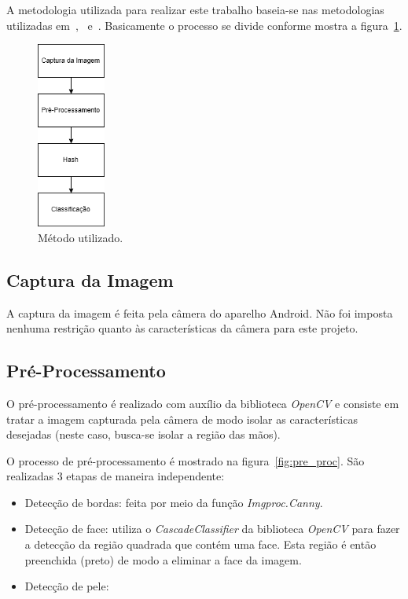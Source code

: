 \par A metodologia utilizada para realizar este trabalho baseia-se nas metodologias utilizadas em~\cite{Barros},~\cite{Yeo} e~\cite{Chen}. Basicamente o processo se divide conforme mostra a figura~\ref{fig:processo}.

\begin{figure}[H]
	\centering
	\includegraphics[width=0.2\textwidth]{./Resources/procedimento.png}
	\caption{Método utilizado.}
	\label{fig:processo}
\end{figure}

\subsection{Captura da Imagem}

\par A captura da imagem é feita pela câmera do aparelho Android. Não foi imposta nenhuma restrição quanto às características da câmera para este projeto.

\subsection{Pré-Processamento}

\par O pré-processamento é realizado com auxílio da biblioteca \textit{OpenCV} e consiste em tratar a imagem capturada pela câmera de modo isolar as características desejadas (neste caso, busca-se isolar a região das mãos).

\par O processo de pré-processamento é mostrado na figura~\ref{fig:pre_proc}. São realizadas 3 etapas de maneira independente:

\begin{itemize}
	\item Detecção de bordas: feita por meio da função \textit{Imgproc.Canny}. 
	\item Detecção de face: utiliza o \textit{CascadeClassifier} da biblioteca \textit{OpenCV} para fazer a detecção da região quadrada que contém uma face. Esta região é então preenchida (preto) de modo a eliminar a face da imagem.
	\item Detecção de pele: 
\end{itemize}

